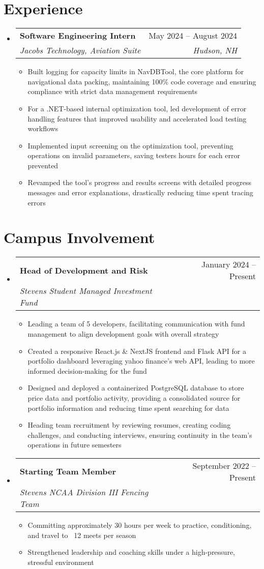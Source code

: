 \documentclass[letterpaper,11pt]{article}
\makeatletter
\newcommand{\resumeItem}[1]{
  \item\small{
    {#1 \vspace{-2pt}}
  }
}
\newcommand{\resumeSubheading}[4]{
  \vspace{-2pt}\item
    \begin{tabular*}{0.97\textwidth}[t]{l@{\extracolsep{\fill}}r}
      \textbf{#1} & #2 \\
      \textit{\small#3} & \textit{\small #4} \\
    \end{tabular*}\vspace{-7pt}
}
\newcommand{\resumeSubSubheading}[2]{
    \item
    \begin{tabular*}{0.97\textwidth}{l@{\extracolsep{\fill}}r}
      \textit{\small#1} & \textit{\small #2} \\
    \end{tabular*}\vspace{-7pt}
}
\newcommand{\resumeSubHeadingListStart}{\begin{itemize}[leftmargin=0.15in, label={}]}
\newcommand{\resumeSubHeadingListEnd}{\end{itemize}}
\newcommand{\resumeItemListStart}{\begin{itemize}}
\newcommand{\resumeItemListEnd}{\end{itemize}\vspace{-5pt}}
\makeatother
\begin{document}
\section{Experience}
  \resumeSubHeadingListStart

    \resumeSubheading
      {Software Engineering Intern}{May 2024 -- August 2024}
      {Jacobs Technology, Aviation Suite}{Hudson, NH}
      \resumeItemListStart
        \resumeItem{Built logging for capacity limits in NavDBTool, the core platform for navigational data packing, maintaining 100\% code coverage and ensuring compliance with strict data management requirements}
        \resumeItem{For a .NET-based internal optimization tool, led development of error handling features that improved usability and accelerated load testing workflows}
        \resumeItem{Implemented input screening on the optimization tool, preventing operations on invalid parameters, saving testers hours for each error prevented}
        \resumeItem{Revamped the tool's progress and results screens with detailed progress messages and error explanations, drastically reducing time spent tracing errors}
      \resumeItemListEnd
    \resumeSubHeadingListEnd
      

\section{Campus Involvement}
  \resumeSubHeadingListStart

    \resumeSubheading{Head of Development and Risk}{January 2024 -- Present}{Stevens Student Managed Investment Fund}{\empty}
    \resumeItemListStart
      \resumeItem{Leading a team of 5 developers, facilitating communication with fund management to align development goals with overall strategy}
      \resumeItem{Created a responsive React.js \& NextJS frontend and Flask API for a portfolio dashboard leveraging yahoo finance’s web API, leading to more informed decision-making for the fund}
      \resumeItem{Designed and deployed a containerized PostgreSQL database to store price data and portfolio activity, providing a consolidated source for portfolio information and reducing time spent searching for data}
      \resumeItem{Heading team recruitment by reviewing resumes, creating coding challenges, and conducting interviews, ensuring continuity in the team’s operations in future semesters}
    \resumeItemListEnd
    \resumeSubheading{Starting Team Member}{September 2022 -- Present}{Stevens NCAA Division III Fencing Team}{\empty}
    \resumeItemListStart
      \resumeItem{Committing approximately 30 hours per week to practice, conditioning, and travel to ~12 meets per season}
      \resumeItem{Strengthened leadership and coaching skills under a high-pressure, stressful environment}
    \resumeItemListEnd
  \resumeSubHeadingListEnd
\end{document}
